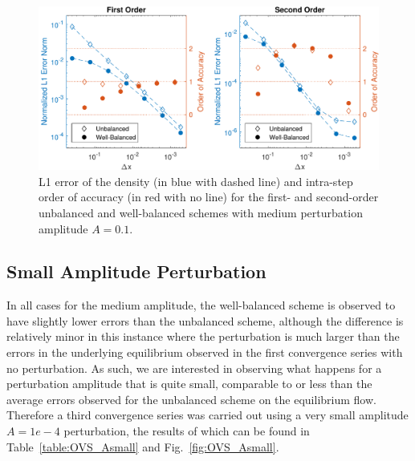 \begin {figure}
\centering
\includegraphics[width=13cm]{figures/OVSeps0_1}
\caption {L1 error of the density (in blue with dashed line) and intra-step order of accuracy (in red with no line) for the first- and second-order unbalanced and well-balanced schemes with medium perturbation amplitude $A=0.1$.}
\label{fig:OVS_Amedium}
\end{figure}

\subsection{Small Amplitude Perturbation}

In all cases for the medium amplitude, the well-balanced scheme is observed to have slightly lower errors than the unbalanced scheme, although the difference is relatively minor in this instance where the perturbation is much larger than the errors in the underlying equilibrium observed in the first convergence series with no perturbation. As such, we are interested in observing what happens for a perturbation amplitude that is quite small, comparable to or less than the average errors observed for the unbalanced scheme on the equilibrium flow. Therefore a third convergence series was carried out using a very small amplitude $A=1e-4$ perturbation, the results of which can be found in Table~\ref{table:OVS_Asmall} and Fig.~\ref{fig:OVS_Asmall}.


